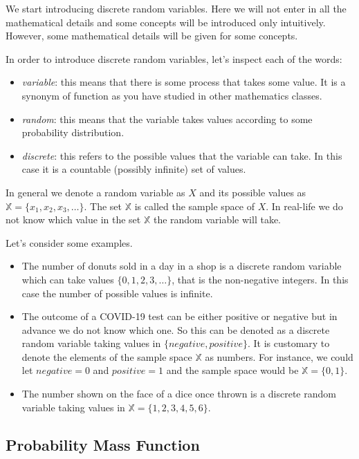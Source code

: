 \documentclass[
]{book}
\theoremstyle{definition}
\theoremstyle{definition}
\theoremstyle{definition}
\theoremstyle{definition}
\theoremstyle{remark}
\begin{document}
We start introducing discrete random variables. Here we will not enter in all the mathematical details and some concepts will be introduced only intuitively. However, some mathematical details will be given for some concepts.

In order to introduce discrete random variables, let's inspect each of the words:

\begin{itemize}
\item
  \emph{variable}: this means that there is some process that takes some value. It is a synonym of function as you have studied in other mathematics classes.
\item
  \emph{random}: this means that the variable takes values according to some probability distribution.
\item
  \emph{discrete}: this refers to the possible values that the variable can take. In this case it is a countable (possibly infinite) set of values.
\end{itemize}

In general we denote a random variable as \(X\) and its possible values as \(\mathbb{X}=\{x_1,x_2,x_3,\dots\}\). The set \(\mathbb{X}\) is called the sample space of \(X\). In real-life we do not know which value in the set \(\mathbb{X}\) the random variable will take.

Let's consider some examples.

\begin{itemize}
\item
  The number of donuts sold in a day in a shop is a discrete random variable which can take values \(\{0,1,2,3,\dots\}\), that is the non-negative integers. In this case the number of possible values is infinite.
\item
  The outcome of a COVID-19 test can be either positive or negative but in advance we do not know which one. So this can be denoted as a discrete random variable taking values in \(\{negative,positive\}\). It is customary to denote the elements of the sample space \(\mathbb{X}\) as numbers. For instance, we could let \(negative = 0\) and \(positive = 1\) and the sample space would be \(\mathbb{X}=\{0,1\}\).
\item
  The number shown on the face of a dice once thrown is a discrete random variable taking values in \(\mathbb{X}=\{1,2,3,4,5,6\}\).
\end{itemize}

\hypertarget{probability-mass-function}{%
\subsection{Probability Mass Function}\label{probability-mass-function}}
\end{document}
